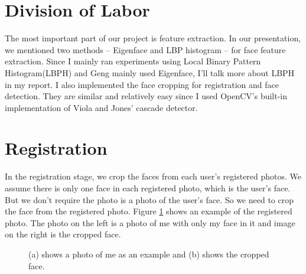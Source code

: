 \documentclass[paper=a4, fontsize=11pt]{scrartcl} %
\numberwithin{equation}{section} %
\numberwithin{figure}{section} %
\numberwithin{table}{section} %
\begin{document}
\section{Division of Labor}
The most important part of our project is feature extraction. In our presentation, we mentioned two methods -- Eigenface\cite{turk1991face} and LBP histogram\cite{ahonen2006face} -- for face feature extraction. Since I mainly ran experiments using Local Binary Pattern Histogram(LBPH) and Geng mainly used Eigenface, I'll talk more about LBPH in my report. I also implemented the face cropping for registration and face detection. They are similar and relatively easy since I used OpenCV's\cite{opencv_library} built-in implementation of Viola and Jones' cascade detector\cite{viola2001rapid}.

\section{Registration}
In the registration stage, we crop the faces from each user's registered photos. We assume there is only one face in each registered photo, which is the user's face. But we don't require the photo is a photo of the user's face. So we need to crop the face from the registered photo. Figure \ref{fig:register_photo} shows an example of the registered photo. The photo on the left is a photo of me with only my face in it and image on the right is the cropped face.

\begin{figure}[!htbp]
	\centering
	\qquad
	\caption{(a) shows a photo of me as an example and (b) shows the cropped face.}
	\label{fig:register_photo}
\end{figure}
\end{document}
